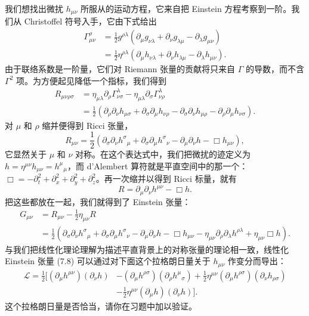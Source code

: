 我们想找出微扰 $h_{\mu\nu}$ 所服从的运动方程，它来自把 Einstein 方程考察到一阶。我们从 Christoffel 符号入手，它由下式给出
\begin{align*}
\Gamma^{\rho}_{\mu\nu} &= \frac{1}{2}g^{\rho\lambda}(\partial_{\mu}g_{\nu\lambda} + \partial_{\nu}g_{\lambda\mu} - \partial_{\lambda}g_{\mu\nu}) \\
&= \frac{1}{2}\eta^{\rho\lambda}(\partial_{\mu}h_{\nu\lambda} + \partial_{\nu}h_{\lambda\mu} - \partial_{\lambda}h_{\mu\nu}).
\tag{7.4}
\end{align*}
由于联络系数是一阶量，它们对 Riemann 张量的贡献将只来自 $\Gamma$ 的导数，而不含 $\Gamma^{2}$ 项。为方便起见降低一个指标，我们得到
\begin{align*}
R_{\mu\nu\rho\sigma} &= \eta_{\mu\lambda}\partial_{\rho}\Gamma^{\lambda}_{\nu\sigma} - \eta_{\mu\lambda}\partial_{\sigma}\Gamma^{\lambda}_{\nu\rho} \\
&= \frac{1}{2}(\partial_{\rho}\partial_{\nu}h_{\mu\sigma} + \partial_{\sigma}\partial_{\mu}h_{\nu\rho} - \partial_{\sigma}\partial_{\nu}h_{\mu\rho} - \partial_{\rho}\partial_{\mu}h_{\nu\sigma}).
\tag{7.5}
\end{align*}
对 $\mu$ 和 $\rho$ 缩并便得到 Ricci 张量，
\begin{equation*}
R_{\mu\nu} = \frac{1}{2}(\partial_{\sigma}\partial_{\nu}h^{\sigma}{}_{\mu} + \partial_{\sigma}\partial_{\mu}h^{\sigma}{}_{\nu} - \partial_{\mu}\partial_{\nu}h - \Box h_{\mu\nu}),
\tag{7.6}
\end{equation*}
它显然关于 $\mu$ 和 $\nu$ 对称。在这个表达式中，我们把微扰的迹定义为 $h = \eta^{\mu\nu}h_{\mu\nu} = h^{\mu}{}_{\mu}$，而 d'Alembert 算符就是平直空间中的那一个：$\Box = -\partial_{t}^{2} + \partial_{x}^{2} + \partial_{y}^{2} + \partial_{z}^{2}$。再一次缩并以得到 Ricci 标量，就有
\begin{equation*}
R = \partial_{\mu}\partial_{\nu}h^{\mu\nu} - \Box h.
\tag{7.7}
\end{equation*}
把这些都放在一起，我们就得到了 Einstein 张量：
\begin{align*}
G_{\mu\nu} &= R_{\mu\nu} - \frac{1}{2}\eta_{\mu\nu}R \\
&= \frac{1}{2}(\partial_{\sigma}\partial_{\nu}h^{\sigma}{}_{\mu} + \partial_{\sigma}\partial_{\mu}h^{\sigma}{}_{\nu} - \partial_{\mu}\partial_{\nu}h - \Box h_{\mu\nu} - \eta_{\mu\nu}\partial_{\rho}\partial_{\lambda}h^{\rho\lambda} + \eta_{\mu\nu}\Box h).
\tag{7.8}
\end{align*}
与我们把线性化理论理解为描述平直背景上的对称张量的理论相一致，线性化 Einstein 张量 (7.8) 可以通过对下面这个拉格朗日量关于 $h_{\mu\nu}$ 作变分而导出：
\begin{align*}
\mathcal{L} = \frac{1}{2}\Big[(\partial_{\mu}h^{\mu\nu})(\partial_{\nu}h) &- (\partial_{\mu}h^{\rho\sigma})(\partial_{\rho}h^{\mu}{}_{\sigma}) + \frac{1}{2}\eta^{\mu\nu}(\partial_{\mu}h^{\rho\sigma})(\partial_{\nu}h_{\rho\sigma}) \\
&- \frac{1}{2}\eta^{\mu\nu}(\partial_{\mu}h)(\partial_{\nu}h)\Big].
\tag{7.9}
\end{align*}
这个拉格朗日量是否恰当，请你在习题中加以验证。

